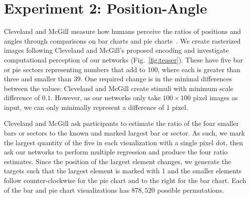 \section{Experiment 2: Position-Angle}
\label{sec:positionangle}

Cleveland and McGill measure how humans perceive the ratios of positions and angles through comparisons on bar charts and pie charts~\cite{cleveland_mcgill}. We create rasterized images following Cleveland and McGill's proposed encoding and investigate computational perception of our networks (Fig.~\ref{fig:teaser}). These have five bar or pie sectors representing numbers that add to 100, where each is greater than three and smaller than 39. One required change is in the minimal differences between the values: Cleveland and McGill create stimuli with minimum scale difference of $0.1$. However, as our networks only take $100\times100$ pixel images as input, we can only minimally represent a difference of $1$ pixel.

Cleveland and McGill ask participants to estimate the ratio of the four smaller bars or sectors to the known and marked largest bar or sector. As such, we mark the largest quantity of the five in each visualization with a single pixel dot, then ask our networks to perform multiple regression and produce the four ratio estimates. Since the position of the largest element changes, we generate the targets such that the largest element is marked with 1 and the smaller elements follow counter-clockwise for the pie chart and to the right for the bar chart. Each of the bar and pie chart visualizations has $878,520$ possible permutations.


